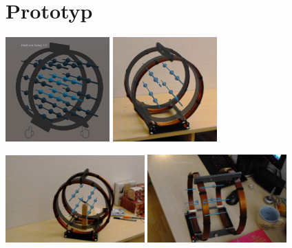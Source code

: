 \part{Prototyp}
\begin{frame}[fragile]{}
\vspace{-1em}
\begin{center}
	\includegraphics[width=0.3\textwidth]{images/Unity.png}
	\hspace{0.05cm}
	\includegraphics[width=0.3\textwidth]{images/Prototype_Screenshot_1.jpg}
	
	
	\includegraphics[width=0.4\textwidth]{images/Prototype_Screenshot_2.jpg}	
	\hspace{0.05cm}
	\includegraphics[width=0.4\textwidth]{images/Prototype_Screenshot_5.jpg}
\end{center}
\end{frame}


